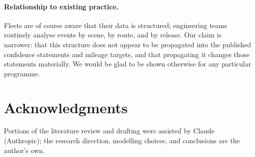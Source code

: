 \documentclass[11pt]{article}
\begin{document}
\paragraph{Relationship to existing practice.} Fleets are of course aware that
their data is structured; engineering teams routinely analyse events by scene, by
route, and by release. Our claim is narrower: that this structure does not appear
to be propagated into the published confidence statements and mileage targets, and
that propagating it changes those statements materially. We would be glad to be
shown otherwise for any particular programme.

\section*{Acknowledgments}

Portions of the literature review and drafting were assisted by Claude (Anthropic);
the research direction, modelling choices, and conclusions are the author's own.



\end{document}

